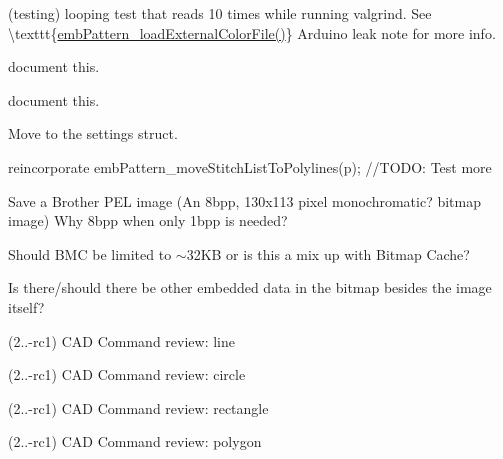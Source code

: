\begin{DoxyRefList}
\label{todo__todo000211}%
%
(testing) looping test that reads 10 times while running valgrind. See \textbackslash{}texttt\{\mbox{\hyperlink{embroidery_8h_a3bf191bd99e2da8d36465f454a4646f6}{emb\+Pattern\+\_\+load\+External\+Color\+File()}}\} Arduino leak note for more info. 
\item[Member \mbox{\hyperlink{embroidermodder_8h_a6e4c300aad52822a324a91edae2235b6}{Index}} ]\label{todo__todo000003}%
%
document this.  
\item[Member \mbox{\hyperlink{embroidermodder_8h_ac4aeb4daa04ff262b2f2fd479dc0e98f}{Index\+Entry}} ]\label{todo__todo000002}%
%
document this.  
\item[Member \mbox{\hyperlink{utility_8cpp_a3e6926ae65525832ed3c1ba9d8df636e}{just\+\_\+opened}} ]\label{todo__todo000012}%
%
Move to the settings struct.  
\item[Member \mbox{\hyperlink{class_mdi_window_a8437f8fd71bcf6da5de2a49cbd0b105b}{Mdi\+Window\+::load\+File}} (const QString \&file\+Name)]\label{todo__todo000004}%
%
reincorporate emb\+Pattern\+\_\+move\+Stitch\+List\+To\+Polylines(p); //\+TODO\+: Test more  
\item[Member \mbox{\hyperlink{class_mdi_window_a2167cf71975c040208ae05b7b6b10a2f}{Mdi\+Window\+::save\+BMC}} ()]\label{todo__todo000005}%
%
Save a Brother PEL image (An 8bpp, 130x113 pixel monochromatic? bitmap image) Why 8bpp when only 1bpp is needed?

\label{todo__todo000006}%
%
Should BMC be limited to $\sim$32\+KB or is this a mix up with Bitmap Cache? 



Is there/should there be other embedded data in the bitmap besides the image itself?  
\item[page \mbox{\hyperlink{index}{Overview}} ]\label{todo__todo000047}%
%
(2..-\/rc1) CAD Command review\+: line

\label{todo__todo000048}%
%
(2..-\/rc1) CAD Command review\+: circle

\label{todo__todo000049}%
%
(2..-\/rc1) CAD Command review\+: rectangle

\label{todo__todo000050}%
%
(2..-\/rc1) CAD Command review\+: polygon


\end{DoxyRefList}
